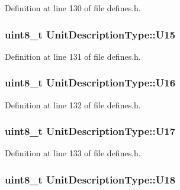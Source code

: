 Definition at line 130 of file defines.\+h.

\subsubsection[{\texorpdfstring{U15}{U15}}]{\setlength{\rightskip}{0pt plus 5cm}uint8\+\_\+t Unit\+Description\+Type\+::\+U15}\hypertarget{structUnitDescriptionType_a67851c4a906293451b0c3e49fe79329c}{}\label{structUnitDescriptionType_a67851c4a906293451b0c3e49fe79329c}


Definition at line 131 of file defines.\+h.

\subsubsection[{\texorpdfstring{U16}{U16}}]{\setlength{\rightskip}{0pt plus 5cm}uint8\+\_\+t Unit\+Description\+Type\+::\+U16}\hypertarget{structUnitDescriptionType_a7ff11ef3bf5d3e485d300dc46bfc06d7}{}\label{structUnitDescriptionType_a7ff11ef3bf5d3e485d300dc46bfc06d7}


Definition at line 132 of file defines.\+h.

\subsubsection[{\texorpdfstring{U17}{U17}}]{\setlength{\rightskip}{0pt plus 5cm}uint8\+\_\+t Unit\+Description\+Type\+::\+U17}\hypertarget{structUnitDescriptionType_a21f0e4e804978c6b29699ae3ed0e5060}{}\label{structUnitDescriptionType_a21f0e4e804978c6b29699ae3ed0e5060}


Definition at line 133 of file defines.\+h.

\subsubsection[{\texorpdfstring{U18}{U18}}]{\setlength{\rightskip}{0pt plus 5cm}uint8\+\_\+t Unit\+Description\+Type\+::\+U18}\hypertarget{structUnitDescriptionType_a5af9c5dc8c43c0c53b847bb0e25d8c18}{}\label{structUnitDescriptionType_a5af9c5dc8c43c0c53b847bb0e25d8c18}


